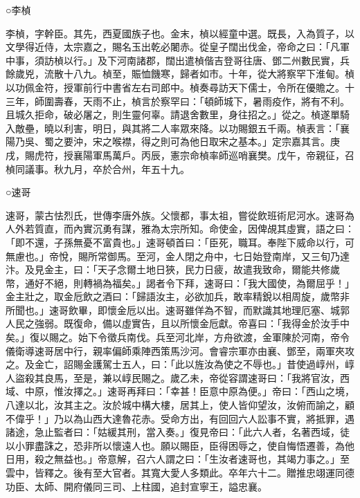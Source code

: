 \begin{pinyinscope}
 ○李楨



 李楨，字幹臣。其先，西夏國族子也。金末，楨以經童中選。既長，入為質子，以文學得近侍，太宗嘉之，賜名玉出乾必闍赤。從皇子闊出伐金，帝命之曰：「凡軍中事，須訪楨以行。」及下河南諸郡，闊出遣楨偕吉登哥往唐、鄧二州數民實，兵餘歲兇，流散十八九。楨至，賑恤饑寒，歸者如市。十年，從大將察罕下淮甸。楨以功佩金符，授軍前行中書省左右司郎中。楨奏尋訪天下儒士，令所在優贍之。十三年，師圍壽春，天雨不止，楨言於察罕曰：「頓師城下，暑雨疫作，將有不利。且城久拒命，破必屠之，則生靈何辜。請退舍數里，身往招之。」從之。楨遂單騎入敵壘，曉以利害，明日，與其將二人率眾來降。以功賜銀五千兩。楨表言：「襄陽乃吳、蜀之要沖，宋之喉襟，得之則可為他日取宋之基本。」定宗嘉其言。庚戌，賜虎符，授襄陽軍馬萬戶。丙辰，憲宗命楨率師巡哨襄樊。戊午，帝親征，召楨同議事。秋九月，卒於合州，年五十九。



 ○速哥



 速哥，蒙古怯烈氏，世傳李唐外族。父懷都，事太祖，嘗從飲班術尼河水。速哥為人外若質直，而內實沉勇有謀，雅為太宗所知。命使金，因俾覘其虛實，語之曰：「即不還，子孫無憂不富貴也。」速哥頓首曰：「臣死，職耳。奉陛下威命以行，可無慮也。」帝悅，賜所常御馬。至河，金人閉之舟中，七日始登南岸，又三旬乃達汴。及見金主，曰：「天子念爾土地日狹，民力日疲，故遣我致命，爾能共修歲幣，通好不絕，則轉禍為福矣。」謁者令下拜，速哥曰：「我大國使，為爾屈乎！」金主壯之，取金卮飲之酒曰：「歸語汝主，必欲加兵，敢率精銳以相周旋，歲幣非所聞也。」速哥飲畢，即懷金卮以出。速哥雖佯為不智，而默識其地理厄塞、城郭人民之強弱。既復命，備以虛實告，且以所懷金卮獻。帝喜曰：「我得金於汝手中矣。」復以賜之。始下令徵兵南伐。兵至河北岸，方舟欲渡，金軍陳於河南，帝令儀衛導速哥居中行，親率偏師乘陣西策馬沙河。會睿宗軍亦由襄、鄧至，兩軍夾攻之。及金亡，詔賜金護駕士五人，曰：「此以旌汝為使之不辱也。」昔使過崞州，崞人盜殺其良馬，至是，兼以崞民賜之。歲乙未，帝從容謂速哥曰：「我將官汝，西域、中原，惟汝擇之。」速哥再拜曰：「幸甚！臣意中原為便。」帝曰：「西山之境，八達以北，汝其主之。汝於城中構大樓，居其上，使人皆仰望汝，汝俯而諭之，顧不偉乎！」乃以為山西大達魯花赤。受命方出，有回回六人訟事不實，將抵罪，遇諸途，急止監者曰：「姑緩其刑，當入奏。」復見帝曰：「此六人者，名著西域，徒以小罪盡誅之，恐非所以懷遠人也。願以賜臣，臣得困辱之，使自悔悟遷善，為他日用，殺之無益也。」帝意解，召六人謂之曰：「生汝者速哥也，其竭力事之。」至雲中，皆釋之。後有至大官者。其寬大愛人多類此。卒年六十二。贈推忠翊運同德功臣、太師、開府儀同三司、上柱國，追封宣寧王，謚忠襄。




\end{pinyinscope}

